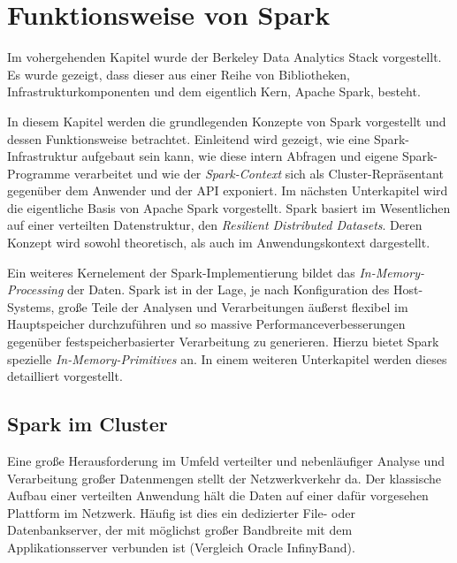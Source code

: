\chapter{Funktionsweise von Spark}
\label{chapter:funktionsweise von Spark}


Im vohergehenden Kapitel wurde der Berkeley Data Analytics Stack vorgestellt. Es wurde gezeigt, dass dieser aus einer Reihe von Bibliotheken, Infrastrukturkomponenten und dem eigentlich Kern, Apache Spark, besteht.

In diesem Kapitel werden die grundlegenden Konzepte von Spark vorgestellt und dessen Funktionsweise betrachtet. Einleitend wird gezeigt, wie eine Spark-Infrastruktur aufgebaut sein kann, wie diese intern Abfragen und eigene Spark-Programme verarbeitet und wie der \textit{Spark-Context} sich als Cluster-Repräsentant gegenüber dem Anwender und der API exponiert. Im nächsten Unterkapitel wird die eigentliche Basis von Apache Spark vorgestellt. Spark basiert im Wesentlichen auf einer verteilten Datenstruktur, den \textit{Resilient Distributed Datasets}. Deren Konzept wird sowohl theoretisch, als auch im Anwendungskontext dargestellt. 

Ein weiteres Kernelement der Spark-Implementierung bildet das \textit{In-Memory-Processing} der Daten. Spark ist in der Lage, je nach Konfiguration des Host-Systems, große Teile der Analysen und Verarbeitungen äußerst flexibel im Hauptspeicher durchzuführen und so massive Performanceverbesserungen gegenüber festspeicherbasierter Verarbeitung zu generieren. Hierzu bietet Spark spezielle \textit{In-Memory-Primitives} an. In einem weiteren Unterkapitel werden dieses detailliert vorgestellt. 

\section{Spark im Cluster}
\label{section:spark im cluster}

Eine große Herausforderung im Umfeld verteilter und nebenläufiger Analyse und Verarbeitung großer Datenmengen stellt der Netzwerkverkehr da. Der klassische Aufbau einer verteilten Anwendung hält die Daten auf einer dafür vorgesehen Plattform im Netzwerk. Häufig ist dies ein dedizierter File- oder Datenbankserver, der mit möglichst großer Bandbreite mit dem Applikationsserver verbunden ist (Vergleich Oracle InfinyBand). 


